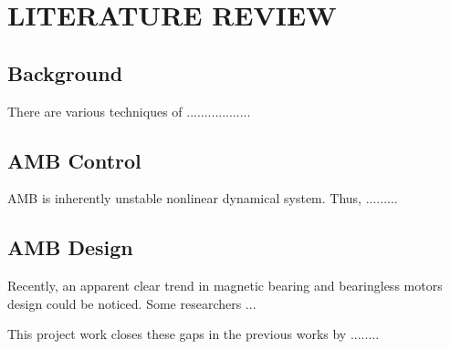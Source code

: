 
\chapter{LITERATURE REVIEW}
\label{chapter:Literature Review}



\ifpdf
    \graphicspath{{2_LiteratureReview/figures/PNG/}{2_LiteratureReview/figures/PDF/}{2_LiteratureReview/figures/}}
\else
    \graphicspath{{2_LiteratureReview/figures/EPS/}{2_LiteratureReview/figures/}}
\fi

\section{Background}
There are various techniques of ..................
\section{AMB Control} 
AMB is inherently unstable nonlinear dynamical system. Thus, .........
\section{AMB Design}
Recently, an apparent clear trend in magnetic bearing and bearingless motors design could be noticed. Some researchers ...

This project work closes these gaps in the previous works by ........
\newpage




